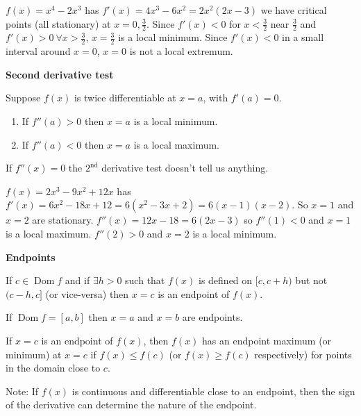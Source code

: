 \documentclass[10pt, a4paper]{article}
\DeclareMathOperator{\Dom}{Dom}
\begin{document}
\begin{example}
    $f(x) = x ^ 4 - 2x ^ 3$ has $f'(x) = 4x ^ 3 - 6x ^ 2 = 2x ^ 2(2x - 3)$
    we have critical points (all stationary) at $x = 0, \frac{3}{2}$.
    Since $f'(x) < 0$ for $x < \frac{3}{2}$ near $\frac{3}{2}$ and
    $f'(x) > 0\ \forall x > \frac{3}{2}$,
    $x = \frac{3}{2}$ is a local minimum.
    Since $f'(x) < 0$ in a small interval around $x = 0$,
    $x = 0$ is not a local extremum.
\end{example}


\textbf{Second derivative test}

Suppose $f(x)$ is twice differentiable at $x = a$,
with $f'(a) = 0$.
\begin{enumerate}[label = \roman*)]
    \item If $f''(a) > 0$ then $x = a$ is a local minimum.
    \item If $f''(a) < 0$ then $x = a$ is a local maximum.
\end{enumerate}
If $f''(x) = 0$ the $2^{\text{nd}}$ derivative test doesn't tell us anything.

\begin{example}
    $f(x) = 2x ^ 3 - 9x ^ 2 + 12x$ has $f'(x) = 6x ^ 2 - 18x + 12 = 6(x ^ 2 - 3x + 2) = 6(x - 1)(x - 2)$.
    So $x = 1$ and $x = 2$ are stationary.
    $f''(x) = 12x - 18 = 6(2x - 3)$
    so $f''(1) < 0$ and $x = 1$ is a local maximum.
    $f''(2) > 0$ and $x = 2$ is a local minimum.
\end{example}

\textbf{Endpoints}
\begin{definition}
    If $c \in \Dom f$ and if $\exists h > 0$ such that $f(x)$ is defined on $[c, c + h)$ but not $(c - h, c]$ (or vice-versa)
    then $x = c$ is an endpoint of $f(x)$.
\end{definition}

\begin{example}
    If $\Dom f = [a, b]$ then $x = a$ and $x = b$ are endpoints.
\end{example}

\begin{definition}
    If $x = c$ is an endpoint of $f(x)$,
    then $f(x)$ has an endpoint maximum (or minimum) at $x = c$
    if $f(x) \leq f(c)$ (or $f(x) \geq f(c)$ respectively)
    for points in the domain close to $c$.
\end{definition}

Note: If $f(x)$ is continuous and differentiable close to an endpoint,
then the sign of the derivative can determine the nature of the endpoint.
\end{document}
